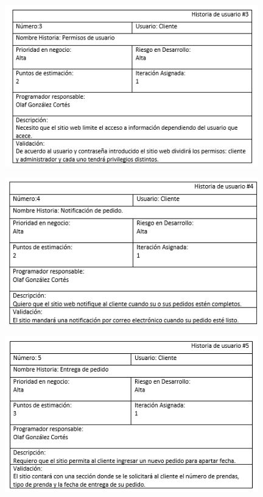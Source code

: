 \newpage


\begin{figure}[htb]
\begin{center}
\includegraphics[width=11cm]{./imagenes/tablas/HU3.png}
\end{center}

\end{figure}


\begin{figure}[htb]
\begin{center}
\includegraphics[width=11cm]{./imagenes/tablas/HU4.png}
\end{center}

\end{figure}

\newpage

\begin{figure}[htb]
\begin{center}
\includegraphics[width=11cm]{./imagenes/tablas/HU5.png}
\end{center}

\end{figure}



